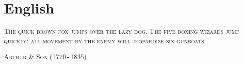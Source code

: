 

\presection\section*{\checkyes English}\postsection

\textsc{The quick brown fox jumps over the lazy dog.
The five boxing wizards jump quickly: all movement 
by the enemy will jeopardize six gunboats.}
 \vspace{1em}

\textsc{Arthur \& Son (1770\,-\,1835)}
